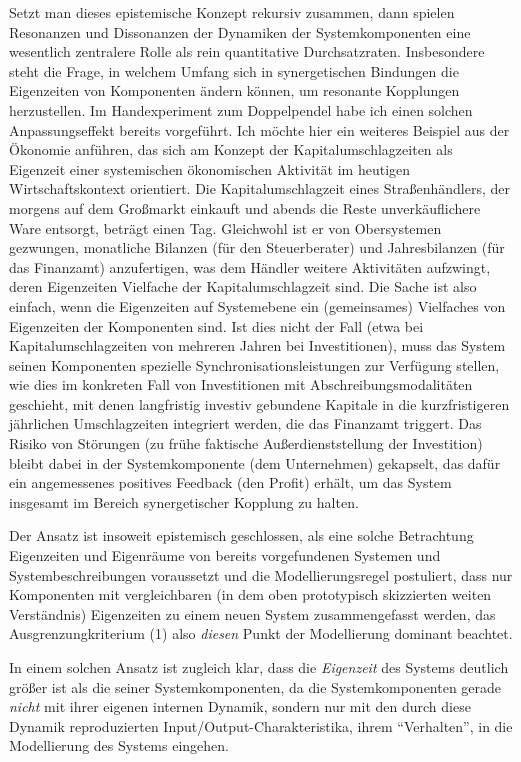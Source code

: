 \documentclass[11pt,a4paper]{article}
\begin{document}
Setzt man dieses epistemische Konzept rekursiv zusammen, dann spielen
Resonanzen und Dissonanzen der Dynamiken der Systemkomponenten eine
wesentlich zentralere Rolle als rein quantitative Durchsatzraten.
Insbesondere steht die Frage, in welchem Umfang sich in synergetischen
Bindungen die Eigenzeiten von Komponenten ändern können, um resonante
Kopplungen herzustellen. Im Handexperiment zum Doppelpendel habe ich
einen solchen Anpassungseffekt bereits vorgeführt. Ich möchte hier ein
weiteres Beispiel aus der Ökonomie anführen, das sich am Konzept der
Kapitalumschlagzeiten als Eigenzeit einer systemischen ökonomischen
Aktivität im heutigen Wirtschaftskontext orientiert. Die
Kapitalumschlagzeit eines Straßenhändlers, der morgens auf dem Großmarkt
einkauft und abends die Reste unverkäuflichere Ware entsorgt, beträgt
einen Tag. Gleichwohl ist er von Obersystemen gezwungen, monatliche
Bilanzen (für den Steuerberater) und Jahresbilanzen (für das Finanzamt)
anzufertigen, was dem Händler weitere Aktivitäten aufzwingt, deren
Eigenzeiten Vielfache der Kapitalumschlagzeit sind. Die Sache ist also
einfach, wenn die Eigenzeiten auf Systemebene ein (gemeinsames)
Vielfaches von Eigenzeiten der Komponenten sind. Ist dies nicht der Fall
(etwa bei Kapitalumschlagzeiten von mehreren Jahren bei Investitionen),
muss das System seinen Komponenten spezielle Synchronisationsleistungen
zur Verfügung stellen, wie dies im konkreten Fall von Investitionen mit
Abschreibungsmodalitäten geschieht, mit denen langfristig investiv
gebundene Kapitale in die kurzfristigeren jährlichen Umschlagzeiten
integriert werden, die das Finanzamt triggert. Das Risiko von Störungen
(zu frühe faktische Außerdienststellung der Investition) bleibt dabei in
der Systemkomponente (dem Unternehmen) gekapselt, das dafür ein
angemessenes positives Feedback (den Profit) erhält, um das System
insgesamt im Bereich synergetischer Kopplung zu halten.

Der Ansatz ist insoweit epistemisch geschlossen, als eine solche
Betrachtung Eigenzeiten und Eigenräume von bereits vorgefundenen
Systemen und Systembeschreibungen voraussetzt und die Modellierungsregel
postuliert, dass nur Komponenten mit vergleichbaren (in dem oben
prototypisch skizzierten weiten Verständnis) Eigenzeiten zu einem neuen
System zusammengefasst werden, das Ausgrenzungkriterium (1) also
\emph{diesen} Punkt der Modellierung dominant beachtet.

In einem solchen Ansatz ist zugleich klar, dass die \emph{Eigenzeit} des
Systems deutlich größer ist als die seiner Systemkomponenten, da die
Systemkomponenten gerade \emph{nicht} mit ihrer eigenen internen
Dynamik, sondern nur mit den durch diese Dynamik reproduzierten
Input/Output-Charakteristika, ihrem ``Verhalten'', in die Modellierung
des Systems eingehen.
\end{document}
